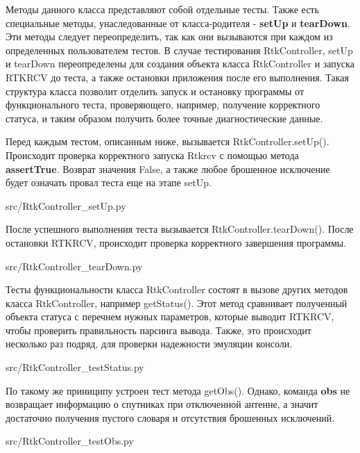 Методы данного класса представляют собой отдельные тесты. Также есть специальные методы, унаследованные от класса-родителя - \textbf{setUp} и \textbf{tearDown}. Эти методы следует переопределить, так как они вызываются при каждом из определенных пользователем тестов. В случае тестирования RtkController, setUp и tearDown переопределены для создания объекта класса RtkController и запуска RTKRCV до теста, а также остановки приложения после его выполнения. Такая структура класса позволит отделить запуск и остановку программы от функционального теста, проверяющего, например, получение корректного статуса, и таким образом получить более точные диагностические данные.

Перед каждым тестом, описанным ниже, вызывается RtkController.setUp(). Происходит проверка корректного запуска Rtkrcv с помощью метода \textbf{assertTrue}. Возврат значения False, а также любое брошенное исключение будет означать провал теста еще на этапе setUp.


{src/RtkController_setUp.py}

После успешного выполнения теста вызывается RtkController.tearDown(). После остановки RTKRCV, происходит проверка корректного завершения программы.


{src/RtkController_tearDown.py}

Тесты функциональности класса RtkController состоят в вызове других методов класса RtkController, например getStatus(). Этот метод сравнивает полученный объекта статуса с перечнем нужных параметров, которые выводит RTKRCV, чтобы проверить правильность парсинга вывода. Также, это происходит несколько раз подряд, для проверки надежности эмуляции консоли.


{src/RtkController_testStatus.py}

По такому же приниципу устроен тест метода getObs(). Однако, команда \textbf{obs} не возвращает информацию о спутниках при отключенной антенне, а значит достаточно получения пустого словаря и отсутствия брошенных исключений.


{src/RtkController_testObs.py}

